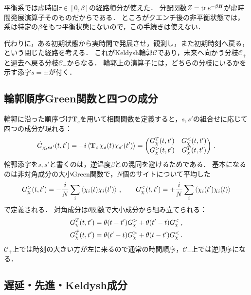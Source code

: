 \documentclass[a4paper,11pt,onecolumn]{jlreq}
\begin{document}
平衡系では虚時間$\tau\in[0,\beta]$の経路積分が使えた．
分配関数$Z=\tr e^{-\beta H}$が虚時間発展演算子そのものだからである．
ところがクエンチ後の非平衡状態では，系は特定の$\beta$をもつ平衡状態にないので，この手続きは使えない．

代わりに，ある初期状態から実時間で発展させ，観測し，また初期時刻へ戻る，という閉じた経路を考える．
これがKeldysh輪郭$\mathcal{C}$であり，未来へ向かう分枝$\mathcal{C}_+$と過去へ戻る分枝$\mathcal{C}_-$からなる．
輪郭上の演算子には，どちらの分枝にいるかを示す添字$s=\pm$が付く．

\subsection{輪郭順序Green関数と四つの成分}
\label{sec:keldysh_components}

輪郭に沿った順序づけ$\mathbf{T}_c$を用いて相関関数を定義すると，$s,s'$の組合せに応じて四つの成分が現れる：
\begin{equation}
  \hat{G}_{\chi,ss'}(t,t')
  = -i\expval{\mathbf{T}_c\,\chi_s(t)\chi_{s'}(t')}
  = \begin{pmatrix}
      G_\chi^{T}(t,t') & G^{<}_\chi(t,t') \\
      G^{>}_\chi(t,t') & G_\chi^{\tilde{T}}(t,t')
    \end{pmatrix}\,.
  \label{eq:contour}
\end{equation}
輪郭添字を$s,s'$と書くのは，逆温度$\beta$との混同を避けるためである．
基本になるのは非対角成分の大小Green関数で，$N$個のサイトについて平均した
\begin{equation}
  G^{>}_\chi(t,t') = -\frac{i}{N}\sum_i\expval{\chi_i(t)\chi_i(t')}\,,
  \qquad
  G^{<}_\chi(t,t') = +\frac{i}{N}\sum_i\expval{\chi_i(t')\chi_i(t)}
  \label{eq:greater_lesser}
\end{equation}
で定義される．
対角成分は$\theta$関数で大小成分から組み立てられる：
\begin{equation}
  \begin{aligned}
    G_\chi^{T}(t,t') &= \theta(t-t')G^{>}_\chi + \theta(t'-t)G^{<}_\chi\,,\\
    G_\chi^{\tilde{T}}(t,t') &= \theta(t'-t)G^{>}_\chi + \theta(t-t')G^{<}_\chi\,.
  \end{aligned}
  \label{eq:T_components}
\end{equation}
$\mathcal{C}_+$上では時刻の大きい方が左に来るので通常の時間順序，$\mathcal{C}_-$上では逆順序になる．

\subsection{遅延・先進・Keldysh成分}
\label{sec:keldysh_rak}
\end{document}
